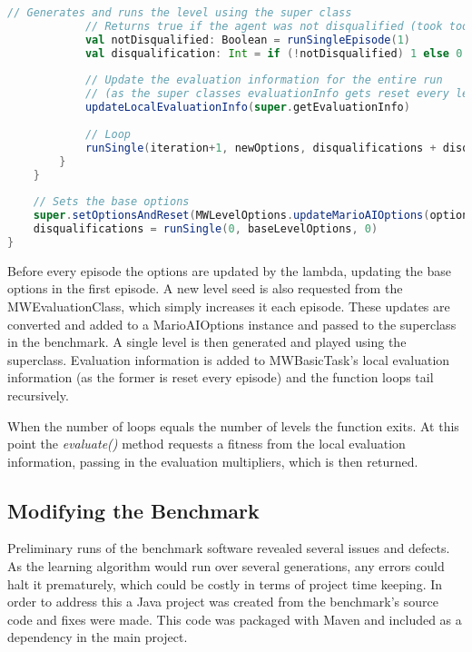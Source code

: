 \begin{minipage}{0.9\linewidth}
\centering
\begin{lstlisting}[language=scala]
            // Generates and runs the level using the super class
            // Returns true if the agent was not disqualified (took too long to return an action)
            val notDisqualified: Boolean = runSingleEpisode(1)
            val disqualification: Int = if (!notDisqualified) 1 else 0
       
            // Update the evaluation information for the entire run
            // (as the super classes evaluationInfo gets reset every level
            updateLocalEvaluationInfo(super.getEvaluationInfo)
            
            // Loop
            runSingle(iteration+1, newOptions, disqualifications + disqualified)
        }
    }
    
    // Sets the base options
    super.setOptionsAndReset(MWLevelOptions.updateMarioAIOptions(options, baseLevelOptions))
    disqualifications = runSingle(0, baseLevelOptions, 0)
}
\end{lstlisting}
\end{minipage}


Before every episode the options are updated by the lambda, updating the base options in the first episode. A new level seed is also requested from the MWEvaluationClass, which simply increases it each episode. These updates are converted and added to a MarioAIOptions instance and passed to the superclass in the benchmark. A single level is then generated and played using the superclass. Evaluation information is added to MWBasicTask's local evaluation information (as the former is reset every episode) and the function loops tail recursively.

When the number of loops equals the number of levels the function exits. At this point the \emph{evaluate()} method requests a fitness from the local evaluation information, passing in the evaluation multipliers, which is then returned.


\subsection{Modifying the Benchmark}
\label{subsec:enginemod}

Preliminary runs of the benchmark software revealed several issues and defects. As the learning algorithm would run over several generations, any errors could halt it prematurely, which could be costly in terms of project time keeping. In order to address this a Java project was created from the benchmark's source code and fixes were made. This code was packaged with Maven and included as a dependency in the main project.

